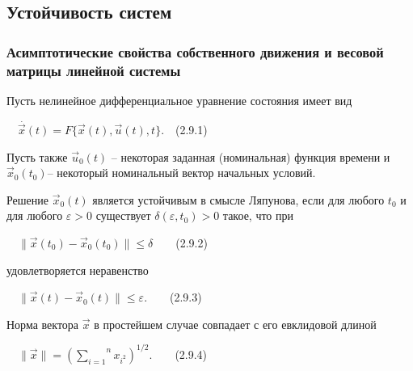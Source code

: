 \documentclass[a4paper]{article}
\begin{document}
\bigskip

\clearpage\setcounter{page}{85}\pagestyle{ii}
\subsection{Устойчивость систем}
\hypertarget{RefHeadingToc455659718}{}\subsubsection{Асимптотические свойства собственного движения и весовой матрицы
линейной системы}
\hypertarget{RefHeadingToc455659719}{}{\begin{russian}\sffamily
Пусть нелинейное дифференциальное уравнение состояния имеет вид
\end{russian}}

{\begin{russian}\sffamily
\ \   $\overset .{\vec x}(t)=F\{\vec x(t),\vec u(t),t\}$.\ \ (2.9.1)\ \ 
\end{russian}}

{\begin{russian}\sffamily
Пусть также  $\vec u_0(t)$ – некоторая заданная (номинальная) функция времени и  $\vec x_0(t_0)$– некоторый номинальный
вектор начальных условий.
\end{russian}}

{\begin{russian}\sffamily
Решение  $\vec x_0(t)$ является устойчивым в смысле Ляпунова, если для любого  $t_0$ и для любого  $ε>0$ существует 
$δ(ε,t_0)>0$ такое, что при
\end{russian}}

{\begin{russian}\sffamily
\ \  $\|\vec x(t_0)-\vec x_0(t_0)\|\le δ$\ \ \ \ (2.9.2)
\end{russian}}

{\begin{russian}\sffamily
удовлетворяется неравенство
\end{russian}}

{\begin{russian}\sffamily
\ \  $\|\vec x(t)-\vec x_0(t)\|\le ε$.\ \ \ \ (2.9.3)
\end{russian}}

{\begin{russian}\sffamily
Норма вектора  $\vec x$ в простейшем случае совпадает с его евклидовой длиной
\end{russian}}

{\begin{russian}\sffamily
\ \  $\|\vec x\|=(\overset n{\underset{i=1}{\sum }}x_{i^2})^{1/2}$.\ \ \ \ (2.9.4)
\end{russian}}
\end{document}
